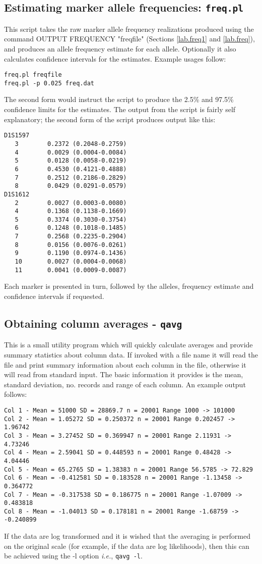 \documentclass[10pt,a4paper]{article}
\newcommand{\IE}{\textit{i.e.},\xspace}
\begin{document}
\subsection{Estimating marker allele frequencies: \texttt{freq.pl}}
\label{lab.freq2}
This script takes the raw marker allele frequency realizations produced
using the command OUTPUT FREQUENCY "freqfile" (Sections \ref{lab.freq1} and
\ref{lab.freq}), and produces an allele frequency estimate for each allele.
Optionally it also calculates confidence intervals for the estimates.
Example usages follow:
\begin{verbatim}
freq.pl freqfile
freq.pl -p 0.025 freq.dat
\end{verbatim}
The second form would instruct the script to produce the 2.5\% and 97.5\%
confidence limits for the estimates.  The output from the script is fairly
self explanatory; the second form of the script produces output like this:
\begin{verbatim}
D1S1597
   3        0.2372 (0.2048-0.2759) 
   4        0.0029 (0.0004-0.0084) 
   5        0.0128 (0.0058-0.0219) 
   6        0.4530 (0.4121-0.4888) 
   7        0.2512 (0.2186-0.2829) 
   8        0.0429 (0.0291-0.0579) 
D1S1612
   2        0.0027 (0.0003-0.0080) 
   4        0.1368 (0.1138-0.1669) 
   5        0.3374 (0.3030-0.3754) 
   6        0.1248 (0.1018-0.1485) 
   7        0.2568 (0.2235-0.2904) 
   8        0.0156 (0.0076-0.0261) 
   9        0.1190 (0.0974-0.1436) 
   10       0.0027 (0.0004-0.0068) 
   11       0.0041 (0.0009-0.0087) 
\end{verbatim}
Each marker is presented in turn, followed by the alleles, frequency
estimate and confidence intervals if requested.
\subsection{Obtaining column averages - \texttt{qavg}}
This is a small utility program which will quickly calculate averages and
provide summary statistics about column data.  If invoked with a file name
it will read the file and print summary information about each column in the
file, otherwise it will read from standard input.  The basic information it
provides is the mean, standard deviation, no. records and range of each
column.  An example output follows:
\begin{verbatim}
Col 1 - Mean = 51000 SD = 28869.7 n = 20001 Range 1000 -> 101000
Col 2 - Mean = 1.05272 SD = 0.250372 n = 20001 Range 0.202457 -> 1.96742
Col 3 - Mean = 3.27452 SD = 0.369947 n = 20001 Range 2.11931 -> 4.73246
Col 4 - Mean = 2.59041 SD = 0.448593 n = 20001 Range 0.48428 -> 4.04446
Col 5 - Mean = 65.2765 SD = 1.38383 n = 20001 Range 56.5785 -> 72.829
Col 6 - Mean = -0.412581 SD = 0.183528 n = 20001 Range -1.13458 -> 0.364772
Col 7 - Mean = -0.317538 SD = 0.186775 n = 20001 Range -1.07009 -> 0.483818
Col 8 - Mean = -1.04013 SD = 0.178181 n = 20001 Range -1.68759 -> -0.240899
\end{verbatim}
If the data are log transformed and it is wished that the averaging is
performed on the original scale (for example, if the data are log
likelihoods), then this can be achieved using the -l option \IE 
\verb+qavg -l+.
\end{document}
